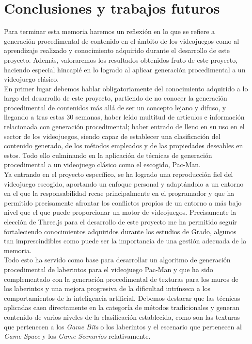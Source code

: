 \section{Conclusiones y trabajos futuros}

Para terminar esta memoria haremos un reflexión en lo que se refiere a generación procedimental de contenido en el ámbito de los videojuegos como al aprendizaje realizado y conocimiento adquirido durante el desarrollo de este proyecto. Además, valoraremos los resultados obtenidos fruto de este proyecto, haciendo especial hincapié en lo logrado al aplicar generación procedimental a un videojuego clásico.\\

En primer lugar debemos hablar obligatoriamente del conocimiento adquirido a lo largo del desarrollo de este proyecto, partiendo de no conocer la generación procedimental de contenidos más allá de ser un concepto lejano y difuso, y llegando a tras estas 30 semanas, haber leído multitud de artículos e información relacionada con generación procedimental; haber entrado de lleno en su uso en el sector de los videojuegos, siendo capaz de establecer una clasificación del contenido generado, de los métodos empleados y de las propiedades deseables en estos. Todo ello culminando en la aplicación de técnicas de generación procedimental a un videojuego clásico como el escogido, Pac-Man.\\

Ya entrando en el proyecto específico, se ha logrado una reproducción fiel del videojuego escogido, aportando un enfoque personal y adaptándolo a un entorno en el que la responsabilidad recae principalmente en el programador y que ha permitido precisamente afrontar los conflictos propios de un entorno a más bajo nivel que el que puede proporcionar un motor de videojuegos. Precisamente la elección de Three.js para el desarrollo de este proyecto me ha permitido seguir fortaleciendo conocimientos adquiridos durante los estudios de Grado, algunos tan imprescindibles como puede ser la importancia de una gestión adecuada de la memoria.\\

Todo esto ha servido como base para desarrollar un algoritmo de generación procedimental de laberintos para el videojuego Pac-Man y que ha sido complementado con la generación procedimental de texturas para los muros de los laberintos y una mejora progresiva de la dificultad intrínseca a los comportamientos de la inteligencia artificial. Debemos destacar que las técnicas aplicadas caen directamente en la categoría de métodos tradicionales y generan contenido de varios niveles de la clasificación establecida, como son las texturas que pertenecen a los \textit{Game Bits} o los laberintos y el escenario que pertenecen al \textit{Game Space} y los \textit{Game Scenarios} relativamente.\\

